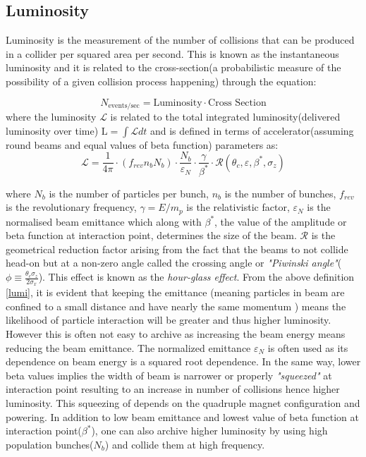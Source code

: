 \subsection{Luminosity}
Luminosity is the measurement of the number of collisions that can be produced in a collider per squared area per second. This is known as the instantaneous luminosity and it is related to the cross-section(a probabilistic measure of the possibility of a given collision process happening) through the equation:

\begin{equation}
N_{\mbox{events/sec}} = \mbox{Luminosity} \cdot \mbox{Cross Section}
\end{equation}
where the luminosity $\mathscr{L}$ is related to the total integrated luminosity(delivered luminosity over time) $\mathrm{L} = \int \mathscr{L}dt$ and is defined in terms of accelerator(assuming round beams and equal values of beta function) parameters as:
\begin{equation}\label{lumi}
\mathscr{L} = \frac{1}{4\pi}\cdot\left(f_{rev}\mathit{n}_{b}\mathit{N}_{b}\right)\cdot\frac{\mathit{N}_{b}}{\varepsilon_{N}}\cdot \frac{\gamma}{\beta^{\ast}}\cdot \mathscr{R}(\theta_{c},\varepsilon,\beta^{\ast},\sigma_{z} )
\end{equation}

where $\mathit{N}_{b}$ is the number of particles per bunch, $\mathit{n}_{b}$ is the number of bunches, $f_{rev}$ is the revolutionary frequency, $\gamma = E/m_{p}$ is the relativistic factor, $\varepsilon_{N}$ is the normalised beam emittance which along with $\beta^{\ast}$, the value of the amplitude or beta function at interaction point, determines the size of the beam. $\mathscr{R}$ is the geometrical reduction factor arising from the fact that the beams to not collide head-on but at a non-zero angle called the crossing angle or \textit{"Piwinski angle"}( $\phi \equiv \frac{\theta_{c}\sigma_{z}}{2\sigma_{x}}$). This effect is known as the \textit{hour-glass effect}.
From the above definition \eqref{lumi}, it is evident that keeping the emittance (meaning particles in beam are confined to a small distance and have nearly the same momentum ) means the likelihood of particle interaction will be greater and thus higher luminosity. However this is often not easy to archive as increasing the beam energy means reducing the beam emittance. The normalized emittance $\varepsilon_{N}$ is often used as its dependence on beam energy is a squared root dependence.
In the same way, lower beta values implies the width of beam is narrower or properly \textit{"squeezed"} at interaction point resulting to an increase in number of collisions hence higher luminosity.
This squeezing of depends on the quadruple magnet configuration and powering. 
In addition to low beam emittance and lowest value of beta function at interaction point($\beta^{\ast}$), one can also archive higher luminosity by using high population bunches($\mathit{N}_{b}$) and collide them at high frequency.
